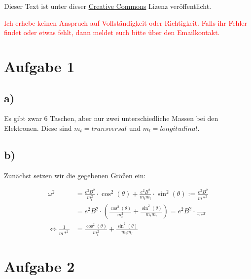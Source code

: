 




\maketitle

Dieser Text ist unter dieser \href{http://creativecommons.org/licenses/by-nc-sa/4.0/}{Creative Commons} Lizenz veröffentlicht.

\textcolor{red}{Ich erhebe keinen Anspruch auf Vollständigkeit oder Richtigkeit. Falls ihr Fehler findet oder etwas fehlt, dann meldet euch bitte über den Emailkontakt.}

\tableofcontents


\newpage



\section{Aufgabe 1}

\subsection*{a)}

Es gibt zwar 6 Taschen, aber nur zwei unterschiedliche Massen bei den Elektronen. Diese sind $m_t = transversal$ und $m_l = longitudinal$.


\subsection*{b)}

Zunächst setzen wir die gegebenen Größen ein:


\begin{align*}
\omega^2 &= \frac{e^2 B^2}{m_t^2} \cdot \cos^2(\theta) + \frac{e^2 B^2}{m_t m_l} \cdot \sin^2(\theta) := \frac{e^2 B^2}{m*^2} \\
&= e^2 B^2 \cdot \left( \frac{\cos^2(\theta)}{m_t^2} + \frac{\sin^2(\theta)}{m_t m_l} \right) = e^2 B^2 \cdot \frac{}{^m*^2} \\
\Leftrightarrow \frac{1}{m*^2} &= \frac{\cos^2(\theta)}{m_t^2} + \frac{\sin^2(\theta)}{m_t m_l}
\end{align*}


\section{Aufgabe 2}

